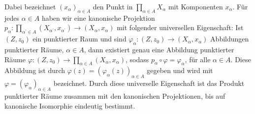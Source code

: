 \documentclass[10pt, letterpaper]{article}
\begin{document}
Dabei bezeichnet $\left(x_{\alpha}\right)_{\alpha \in A}$ den Punkt in $\prod_{\alpha \in A} X_{\alpha}$ mit Komponenten $x_{\alpha}$. Für jedes $\alpha \in A$ haben wir eine kanonische Projektion $p_{\alpha}: \prod_{\alpha^{\prime} \in A}\left(X_{\alpha^{\prime}}, x_{\alpha^{\prime}}\right) \rightarrow\left(X_{\alpha}, x_{\alpha}\right)$ mit folgender universellen Eigenschaft: Ist $\left(Z, z_{0}\right)$ ein punktierter Raum und sind $\varphi_{\alpha}:\left(Z, z_{0}\right) \rightarrow\left(X_{\alpha}, x_{\alpha}\right)$ Abbildungen punktierter Räume, $\alpha \in A$, dann existiert genau eine Abbildung punktierter Räume $\varphi:\left(Z, z_{0}\right) \rightarrow \prod_{\alpha \in A}\left(X_{\alpha}, x_{\alpha}\right)$, sodass $p_{\alpha} \circ \varphi=\varphi_{\alpha}$, für alle $\alpha \in A$. Diese Abbildung ist durch $\varphi(z)=\left(\varphi_{\alpha}(z)\right)_{\alpha \in A}$ gegeben und wird mit $\varphi=\left(\varphi_{\alpha}\right)_{\alpha \in A}$ bezeichnet. Durch diese universelle Eigenschaft ist das Produkt punktierter Räume zusammen mit den kanonischen Projektionen, bis auf kanonische Isomorphie eindeutig bestimmt.
\end{document}
